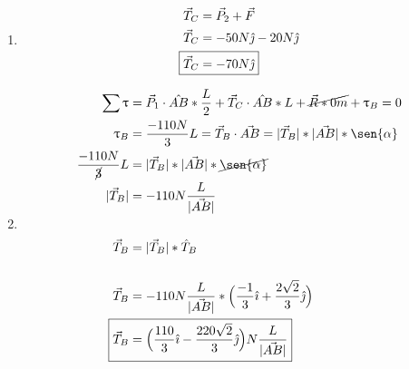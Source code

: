 \documentclass[12pt, twoside]{article}
\begin{document}
\begin{enumerate}
		\begin{enumerate}
			\item
				\begin{align*}
					\vec{T}_C &= \vec{P}_2 + \vec{F}\\
					\vec{T}_C &= -50N\hat{\jmath}-20N\hat{\jmath}\\
					\Aboxed
					{
						\vec{T}_C &= -70N\hat{\jmath}
					}
				\end{align*}
			\item
				\begin{align*}
					\sum \uptau &= \vec{P}_1\cdot\hat{AB}* \frac{L}{2}+
					\vec{T}_C\cdot\hat{AB}*L+
					\cancel{\vec{R}*0m}+
					\uptau_B=0\\
					\uptau_B &= \frac{-110N}{3}L = \vec{T}_B \cdot\vec{AB} = |\vec{T}_B|*|\vec{AB}|*\sen{\alpha}\\
					\frac{-110N}{\cancel{3}}L &= |\vec{T}_B|*|\vec{AB}|*\cancel{\sen{\alpha}}\\
					|\vec{T}_B| &= -110N\frac{L}{|\vec{AB}|}\\
					\\
					\vec{T}_B &= |\vec{T}_B|*\hat{T}_B\\
					\\
					\vec{T}_B &= -110N\frac{L}{|\vec{AB}|}*\Big{(}
					\frac{-1}{3}\hat{\imath} +
					\frac{2\sqrt{2}}{3}\hat{\jmath}
					\Big{)}\\
					\Aboxed
					{
						\vec{T}_B &= \Big{(}
						\frac{110}{3}\hat{\imath} -
						\frac{220\sqrt{2}}{3}\hat{\jmath}
						\Big{)}N\frac{L}{|\vec{AB}|}
					}
				\end{align*}
		\end{enumerate}
\end{enumerate}
\end{document}
